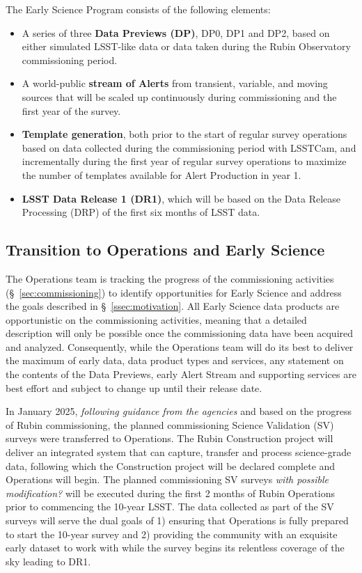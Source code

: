 The Early Science Program consists of the following elements:
\begin{itemize}
	\item A series of three \textbf{Data Previews (DP)}, DP0, DP1 and DP2,  based on either simulated LSST-like data or data taken during the Rubin Observatory commissioning period. 
	\item A world-public \textbf{stream of Alerts} from transient, variable, and moving sources that will be scaled up continuously during commissioning and the first year of the survey. 
	\item  \textbf{Template generation}, both prior to the start of regular survey operations based on data collected during the commissioning period with LSSTCam, and incrementally during the first year of regular survey operations  to maximize the number of templates available for Alert Production in year 1. 
	\item \textbf{LSST Data Release 1 (DR1)}, which will be based on the Data Release Processing (DRP) of the first six months of LSST data.
\end{itemize}

%
\subsection{Transition to Operations and Early Science  } 
\label{ssec:transition}

The Operations team is tracking the progress of the commissioning activities (\S~\ref{sec:commissioning}) to identify opportunities for Early Science and address the goals described in \S~\ref{ssec:motivation}.
All Early Science data products are opportunistic on the commissioning activities, meaning that a detailed description will only be possible once the commissioning data have been acquired and analyzed. 
Consequently, while the Operations team will do its best to deliver the maximum of early data, data product types and services, any statement on the contents of the Data Previews, early Alert Stream and supporting services are best effort and subject to change up until their release date. 

In January 2025, \textit{following guidance from the agencies} and based on the progress of Rubin commissioning, the planned commissioning Science Validation (SV) surveys were transferred to Operations. 
The Rubin Construction project will deliver an integrated system that can capture, transfer and process science-grade data, following which the Construction project will be declared complete and Operations will begin. 
The planned commissioning SV surveys \textit{with possible modification?} will  be executed during the first 2 months of Rubin Operations prior to commencing the 10-year LSST. 
The data collected as part of the SV surveys will serve the dual goals of 1) ensuring that Operations is fully prepared to start the 10-year survey and 2) providing the community with an exquisite early dataset to work with while the survey begins its relentless coverage of the sky leading to DR1.

